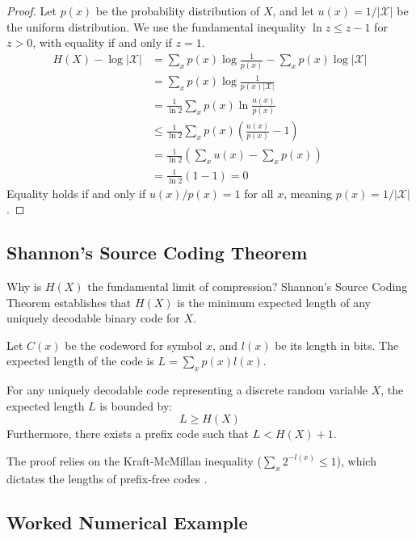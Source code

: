 \begin{proof}
Let $p(x)$ be the probability distribution of $X$, and let $u(x) = 1/|\mathcal{X}|$ be the uniform distribution. We use the fundamental inequality $\ln z \leq z - 1$ for $z > 0$, with equality if and only if $z = 1$.
\begin{align*}
    H(X) - \log |\mathcal{X}| &= \sum_{x} p(x) \log \frac{1}{p(x)} - \sum_{x} p(x) \log |\mathcal{X}| \\
    &= \sum_{x} p(x) \log \frac{1}{p(x)|\mathcal{X}|} \\
    &= \frac{1}{\ln 2} \sum_{x} p(x) \ln \frac{u(x)}{p(x)} \\
    &\leq \frac{1}{\ln 2} \sum_{x} p(x) \left( \frac{u(x)}{p(x)} - 1 \right) \\
    &= \frac{1}{\ln 2} \left( \sum_{x} u(x) - \sum_{x} p(x) \right) \\
    &= \frac{1}{\ln 2} (1 - 1) = 0
\end{align*}
Equality holds if and only if $u(x)/p(x) = 1$ for all $x$, meaning $p(x) = 1/|\mathcal{X}|$.
\end{proof}

\subsection{Shannon's Source Coding Theorem}

Why is $H(X)$ the fundamental limit of compression? Shannon's Source Coding Theorem establishes that $H(X)$ is the minimum expected length of any uniquely decodable binary code for $X$. 

Let $C(x)$ be the codeword for symbol $x$, and $l(x)$ be its length in bits. The expected length of the code is $L = \sum_x p(x) l(x)$.

\begin{theorem}
\label{thm:source_coding}
For any uniquely decodable code representing a discrete random variable $X$, the expected length $L$ is bounded by:
\begin{equation}
    L \geq H(X)
\end{equation}
Furthermore, there exists a prefix code such that $L < H(X) + 1$.
\end{theorem}
The proof relies on the Kraft-McMillan inequality ($\sum_x 2^{-l(x)} \leq 1$), which dictates the lengths of prefix-free codes \cite{cover1999elements}.

\subsection{Worked Numerical Example}

